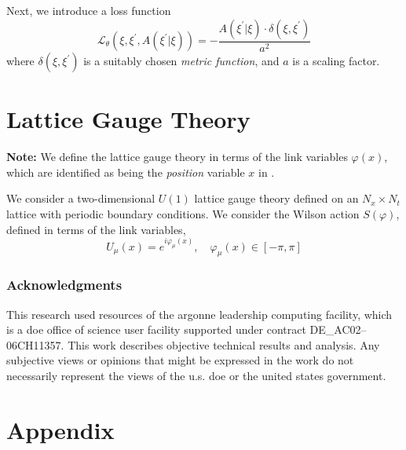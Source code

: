 \documentclass{article} %
\begin{document}
Next, we introduce a loss function
%
\begin{equation}
   \mathcal{L}_{\theta}{\left(\xi, \xi^{\prime}, A(\xi^{\prime}|\xi)\right)}
      = -\frac{A(\xi^{\prime}|\xi)\cdot \delta(\xi, \xi^{\prime})}{a^{2}}
\end{equation}
%
where \(\delta(\xi, \xi^{\prime})\) is a suitably chosen \emph{metric function}, and \(a\) is a scaling factor.

\section{\label{sec:lattice_gauge_theory}Lattice Gauge Theory}
%
\textbf{Note:} We define the lattice gauge theory in terms of the link variables \(\varphi(x)\), which are identified as
being the \emph{position} variable \(x\) in .
%

We consider a two-dimensional \(U(1)\) lattice gauge theory defined on an \(N_{x}\times N_{t}\) lattice with periodic
boundary conditions.
%
We consider the Wilson action \(S(\varphi)\), defined in terms of the link variables,
%
\begin{equation}
   U_{\mu}(x) = e^{i\varphi_{\mu}(x)}, \quad \varphi_{\mu}(x) \in \left[-\pi, \pi\right]
\end{equation}
%



\subsubsection*{Acknowledgments}
This research used resources of the argonne leadership computing facility, which is a doe office of science user
facility supported under contract DE\_AC02--06CH11357.%
%
This work describes objective technical results and analysis.
%
Any subjective views or opinions that might be expressed in the work do not necessarily represent the views of the u.s.
doe or the united states government.






\appendix
\section{Appendix}
\end{document}
